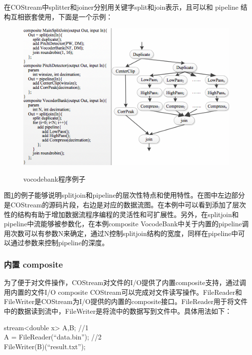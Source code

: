 在COStream中splitter和joiner分别用关键字split和join表示，且可以和 pipeline 结构互相嵌套使用，下面是一个示例：

\begin{figure}[htbp]
  \centering
  \includegraphics[width=1.0\textwidth]{Img/Chap_Application/Yu/vocodebank.png}\\
  \caption{vocodebank程序例子}\label{fig:vocodebank}
\end{figure}

图\ref{fig:vocodebank}的例子能够说明splitjoin和pipeline的层次性特点和使用特性。在图中左边部分是COStream的源码片段，右边是对应的数据流图。在本例中可以看到添加了层次性的结构有助于增加数据流程序编程的灵活性和可扩展性。另外，在splitjoin和pipeline中流能够被参数化，在本例composite VocodeBank中关于内置的pipeline调用次数可以有参数N来确定，通过N控制splitjoin结构的宽度，同样在pipeline中可以通过参数来控制pipeline的深度。

\subsubsection{内置 composite}

为了便于对文件操作，COStream对文件的I/O提供了内置composite支持，通过调用内置的文件I/O composite COStream可以完成对文件读写操作。FileReader和FileWriter是COStream为I/O提供的内置的composite接口。FileReader用于将文件中的数据读到流中，FileWriter是将流中的数据写到文件中。具体用法如下：

\begin{algorithm}\label{algo:costream}
stream<double x> A,B;			//1\\
A = FileReader(“data.bin”);		//2\\
FileWriter(B)(“result.txt”);
\end{algorithm}

